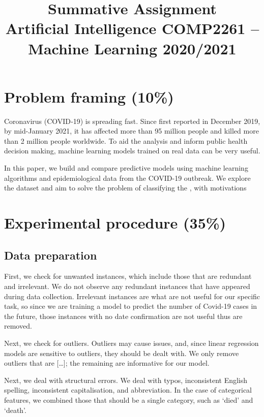 \documentclass[twoside,11pt]{article}
\begin{document}
\title{Summative Assignment\\ 
Artificial Intelligence COMP2261 –\\
Machine Learning 2020/2021}

\maketitle

\cite{kramer1991nonlinear}

\section{Problem framing (10\%)}
Coronavirus (COVID‑19) is spreading fast. Since first reported in December 2019, by mid-January 2021, it has affected more than 95 million people and killed more than 2 million people worldwide. To aid the analysis and inform public health decision making, machine learning models trained on real data can be very useful.

In this paper, we build and compare predictive models using machine learning algorithms and epidemiological data from the COVID-19 outbreak. We explore the dataset and aim to solve the problem of classifying the , with motivations  

\section{Experimental procedure (35\%)}
\subsection{Data preparation}
First, we check for unwanted instances, which include those that are redundant and irrelevant. We do not observe any redundant instances that have appeared during data collection. Irrelevant instances are what are not useful for our specific task, so since we are training a model to predict the number of Covid-19 cases in the future, those instances with no date confirmation are not useful thus are removed.

Next, we check for outliers. Outliers may cause issues, and, since linear regression models are sensitive to outliers, they should be dealt with. We only remove outliers that are [\dots]; the remaining are informative for our model. 

Next, we deal with structural errors. We deal with typos, inconsistent English spelling, inconsistent capitalisation, and abbreviation. In the case of categorical features, we combined those that should be a single category, such as `died' and `death'.
\end{document}
